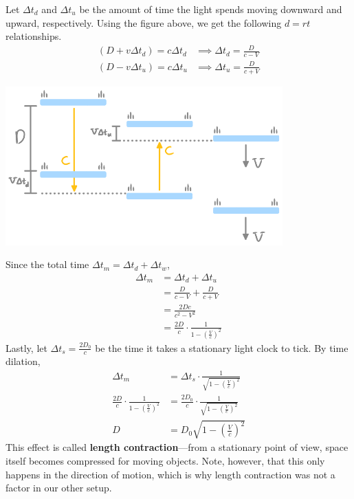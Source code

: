 \documentclass[10pt,a4paper,oneside]{book}
\begin{document}
Let $\Delta t_d$ and $\Delta t_u$ be the amount of time the light spends moving downward and upward, respectively.
Using the figure above, we get the following $d = rt$ relationships.
\begin{align*}
    (D + v \Delta t_d) = c \Delta t_d &\implies \Delta t_d = \frac{D}{c - V} \\
    (D - v \Delta t_u) = c \Delta t_u &\implies \Delta t_u = \frac{D}{c + V}
\end{align*}
\begin{center}
    \includegraphics[width=0.8\textwidth]{longLightClock.png}
\end{center}
Since the total time $\Delta t_m = \Delta t_d + \Delta t_w$,
\begin{align*}
    \Delta t_m &= \Delta t_d + \Delta t_u \\
    &= \frac{D}{c - V} + \frac{D}{c + V} \\
    &= \frac{2Dc}{c^2 - V^2} \\
    &= \frac{2D}{c} \cdot \frac{1}{1 - \left( \frac{V}{c} \right)^2}
\end{align*}
Lastly, let $\Delta t_s = \frac{2D_0}{c}$ be the time it takes a stationary light clock to tick.
By time dilation,
\begin{align*}
    \Delta t_m &= \Delta t_s \cdot \frac{1}{\sqrt{1 - \left( \frac{V}{c} \right)^2}} \\
    \frac{2D}{c} \cdot \frac{1}{1 - \left( \frac{V}{c} \right)^2} &= \frac{2D_0}{c} \cdot \frac{1}{\sqrt{1 - \left( \frac{V}{c} \right)^2}} \\
    D &= D_0 \sqrt{1 - \left( \frac{V}{c} \right)^2}
\end{align*}
This effect is called \textbf{length contraction}---from a stationary point of view, space itself becomes compressed for moving objects.
Note, however, that this only happens in the direction of motion, which is why length contraction was not a factor in our other setup.
\end{document}
